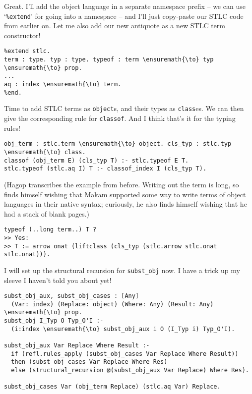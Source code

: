 \heroADVISOR{} Great. I'll add the object language in a separate namespace
prefix -- we can use `\texttt{\%extend}' for going into a namespace --
and I'll just copy-paste our STLC code from earlier on. Let me also add
our new antiquote as a new STLC term constructor!

\begin{verbatim}
%extend stlc.
term : type. typ : type. typeof : term \ensuremath{\to} typ \ensuremath{\to} prop.
...
aq : index \ensuremath{\to} term.
%end.
\end{verbatim}

\heroSTUDENT{} Time to add STLC terms as \texttt{object}s, and their types as
\texttt{class}es. We can then give the corresponding rule for
\texttt{classof}. And I think that's it for the typing rules!

\begin{verbatim}
obj_term : stlc.term \ensuremath{\to} object. cls_typ : stlc.typ \ensuremath{\to} class.
classof (obj_term E) (cls_typ T) :- stlc.typeof E T.
stlc.typeof (stlc.aq I) T :- classof_index I (cls_typ T).
\end{verbatim}

\begin{scenecomment}
(Hagop transcribes the example from before. Writing out the term is long, so finds himself
wishing that Makam supported some way to write terms of object languages in their native syntax;
curiously, he also finds himself wishing that he had a stack of blank pages.)
\end{scenecomment}

\begin{verbatim}
typeof (..long term..) T ?
>> Yes:
>> T := arrow onat (liftclass (cls_typ (stlc.arrow stlc.onat stlc.onat))).
\end{verbatim}



\heroADVISOR{} I will set up the structural recursion for \texttt{subst\_obj}
now. I have a trick up my sleeve I haven't told you about yet!

\begin{verbatim}
subst_obj_aux, subst_obj_cases : [Any]
  (Var: index) (Replace: object) (Where: Any) (Result: Any) \ensuremath{\to} prop.
subst_obj I_Typ O Typ_O'I :-
  (i:index \ensuremath{\to} subst_obj_aux i O (I_Typ i) Typ_O'I).

subst_obj_aux Var Replace Where Result :-
  if (refl.rules_apply (subst_obj_cases Var Replace Where Result))
  then (subst_obj_cases Var Replace Where Res)
  else (structural_recursion @(subst_obj_aux Var Replace) Where Res).

subst_obj_cases Var (obj_term Replace) (stlc.aq Var) Replace.
\end{verbatim}

